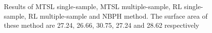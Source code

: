 
\begin{figure}[h]
	\centering
	\caption{Results of MTSL single-sample, MTSL multiple-sample, RL single-sample, RL multiple-sample and NBPH method. The surface area of these method are 27.24, 26.66, 30.75, 27.24 and 28.62 respectively}
	\label{fig:result-example}
	\vspace{-10pt}
\end{figure}
